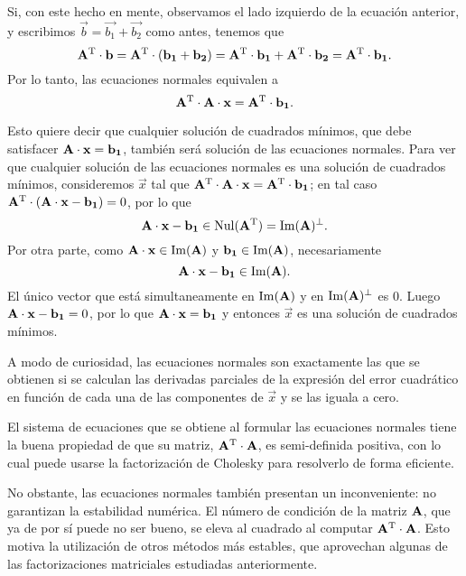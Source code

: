 Si, con este hecho en mente, observamos el lado izquierdo de la ecuación
anterior, y escribimos $\vec{b} = \vec{b_1} + \vec{b_2}$
como antes, tenemos que 
\[ \mathbf{A}^{\mathrm{T}} \cdot \mathbf{b}
    = \mathbf{A}^{\mathrm{T}} \cdot (\mathbf{b_1} + \mathbf{b_2})
    = \mathbf{A}^{\mathrm{T}} \cdot \mathbf{b_1} + \mathbf{A}^{\mathrm{T}} \cdot \mathbf{b_2}
    = \mathbf{A}^{\mathrm{T}} \cdot \mathbf{b_1}. \]
Por lo tanto, las ecuaciones normales equivalen a 
\[ \mathbf{A}^{\mathrm{T}} \cdot \mathbf{A} \cdot \mathbf{x} = \mathbf{A}^{\mathrm{T}} \cdot \mathbf{b_1}. \]

Esto quiere decir que cualquier solución de cuadrados mínimos, que debe
satisfacer $\mathbf{A} \cdot \mathbf{x} = \mathbf{b_1}$, también será solución de las
ecuaciones normales. Para ver que cualquier solución de las
ecuaciones normales es una solución de cuadrados mínimos, consideremos
$\vec{x}$ tal que $\mathbf{A}^{\mathrm{T}} \cdot \mathbf{A} \cdot \mathbf{x} = \mathbf{A}^{\mathrm{T}} \cdot \mathbf{b_1}$; en tal caso $\mathbf{A}^{\mathrm{T}} \cdot (\mathbf{A} \cdot \mathbf{x} -
\mathbf{b_1}) = 0$, por lo que
\[ \mathbf{A} \cdot \mathbf{x} - \mathbf{b_1} \in \operatorname{Nul}(\mathbf{A}^{\mathrm{T}}) =
    \operatorname{Im}(\mathbf{A})^{\bot}. \]
Por otra parte, como $\mathbf{A} \cdot \mathbf{x} \in \operatorname{Im}(\mathbf{A})$ y
$\mathbf{b_1} \in \operatorname{Im}(\mathbf{A})$, necesariamente
\[ \mathbf{A} \cdot \mathbf{x} - \mathbf{b_1} \in \operatorname{Im}(\mathbf{A}). \]
El único vector que está simultaneamente en $\operatorname{Im}(\mathbf{A})$ y en
$\operatorname{Im}(\mathbf{A})^{\bot}$ es $0$. Luego $\mathbf{A} \cdot \mathbf{x} - \mathbf{b_1} = 0$,
por lo que $\mathbf{A} \cdot \mathbf{x} = \mathbf{b_1}$ y entonces $\vec{x}$ es una
solución de cuadrados mínimos.

A modo de curiosidad, las ecuaciones normales son exactamente las que se
obtienen si se calculan las derivadas parciales de la expresión del error
cuadrático en función de cada una de las componentes de $\vec{x}$ y se las
iguala a cero.

El sistema de ecuaciones que se obtiene al formular las ecuaciones normales
tiene la buena propiedad de que su matriz, $\mathbf{A}^{\mathrm{T}} \cdot \mathbf{A}$,
es semi-definida positiva, con lo cual puede usarse la factorización de
Cholesky para resolverlo de forma eficiente.

No obstante, las ecuaciones normales también presentan un inconveniente: no garantizan la estabilidad numérica.
El número de condición de la matriz $\mathbf{A}$, que ya de por sí puede no ser
bueno, se eleva al cuadrado al computar $\mathbf{A}^{\mathrm{T}} \cdot \mathbf{A}$.
Esto motiva la utilización de otros métodos más estables, que aprovechan
algunas de las factorizaciones matriciales estudiadas anteriormente.

